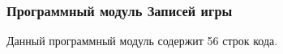 \subsubsection{Программный модуль \textbf{Записей игры}}

Данный программный модуль содержит 56 строк кода.
